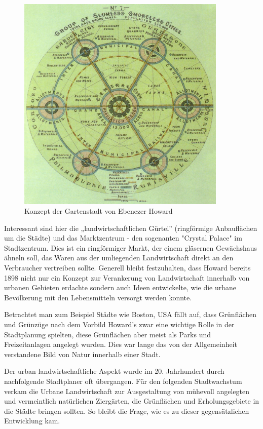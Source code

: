 \documentclass{scrartcl}
\begin{document}
\begin{figure}[htbp]
\centering
\includegraphics[width=10cm]{image_folder/GardenCityConcept_EbenezerHoward.jpg}
\caption{Konzept der Gartenstadt von Ebenezer Howard}
\label{fig:GardenCityConcept_EbenezerHoward}
\end{figure}

Interessant sind hier die „landwirtschaftlichen Gürtel” (ringförmige Anbauflächen um die Städte) und das Marktzentrum - den sogenanten "Crystal Palace" im Stadtzentrum. Dies ist ein ringförmiger Markt, der einem gläsernen Gewächshaus ähneln soll, das Waren aus der umliegenden Landwirtschaft direkt an den Verbraucher vertreiben sollte. Generell bleibt festzuhalten, dass Howard bereits 1898 nicht nur ein Konzept zur Verankerung von Landwirtschaft innerhalb von urbanen Gebieten erdachte sondern auch Ideen entwickelte, wie die urbane Bevölkerung mit den Lebensmitteln versorgt werden konnte.

Betrachtet man zum Beispiel Städte wie Boston, USA fällt auf, dass Grünflächen und Grünzüge nach dem Vorbild Howard's zwar eine wichtige Rolle in der Stadtplanung spielten, diese Grünflächen aber meist als Parks und Freizeitanlagen angelegt wurden. Dies war lange das von der Allgemeinheit verstandene Bild von Natur innerhalb einer Stadt.

Der urban landwirtschaftliche Aspekt wurde im 20. Jahrhundert durch nachfolgende Stadtplaner oft übergangen. Für den folgenden Stadtwachstum verkam die Urbane Landwirtschaft zur Ausgestaltung von mühevoll angelegten und vermeintlich natürlichen Ziergärten, die Grünflächen und Erholungsgebiete in die Städte bringen sollten. So bleibt die Frage, wie es zu dieser gegensätzlichen Entwicklung kam.
\end{document}
